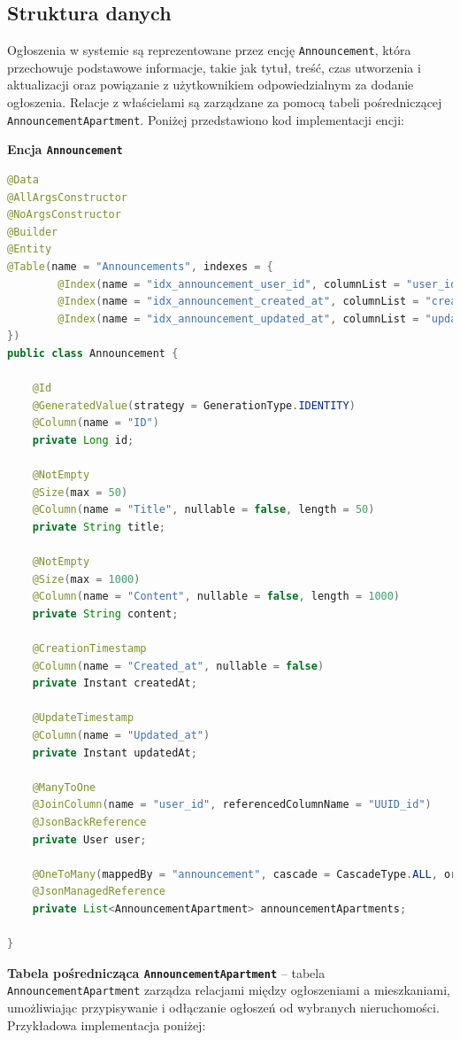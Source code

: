 \subsection{Struktura danych}

Ogłoszenia w systemie są reprezentowane przez encję \texttt{Announcement}, która przechowuje podstawowe informacje, takie jak tytuł, treść, czas utworzenia i aktualizacji oraz powiązanie z użytkownikiem odpowiedzialnym za dodanie ogłoszenia. Relacje z właścielami są zarządzane za pomocą tabeli pośredniczącej \texttt{AnnouncementApartment}. Poniżej przedstawiono kod implementacji encji:

\textbf{Encja \texttt{Announcement}}
\begin{lstlisting}[language=Java, caption=Encja \texttt{Announcement}]
@Data
@AllArgsConstructor
@NoArgsConstructor
@Builder
@Entity
@Table(name = "Announcements", indexes = {
        @Index(name = "idx_announcement_user_id", columnList = "user_id"),
        @Index(name = "idx_announcement_created_at", columnList = "created_at"),
        @Index(name = "idx_announcement_updated_at", columnList = "updated_at")
})
public class Announcement {

    @Id
    @GeneratedValue(strategy = GenerationType.IDENTITY)
    @Column(name = "ID")
    private Long id;

    @NotEmpty
    @Size(max = 50)
    @Column(name = "Title", nullable = false, length = 50)
    private String title;

    @NotEmpty
    @Size(max = 1000)
    @Column(name = "Content", nullable = false, length = 1000)
    private String content;

    @CreationTimestamp
    @Column(name = "Created_at", nullable = false)
    private Instant createdAt;

    @UpdateTimestamp
    @Column(name = "Updated_at")
    private Instant updatedAt;

    @ManyToOne
    @JoinColumn(name = "user_id", referencedColumnName = "UUID_id")
    @JsonBackReference
    private User user;

    @OneToMany(mappedBy = "announcement", cascade = CascadeType.ALL, orphanRemoval = true, fetch = FetchType.LAZY)
    @JsonManagedReference
    private List<AnnouncementApartment> announcementApartments;

}
\end{lstlisting}

\textbf{Tabela pośrednicząca \texttt{AnnouncementApartment}} -- tabela \texttt{AnnouncementApartment} zarządza relacjami między ogłoszeniami a mieszkaniami, umożliwiając przypisywanie i odłączanie ogłoszeń od wybranych nieruchomości. Przykładowa implementacja poniżej:

